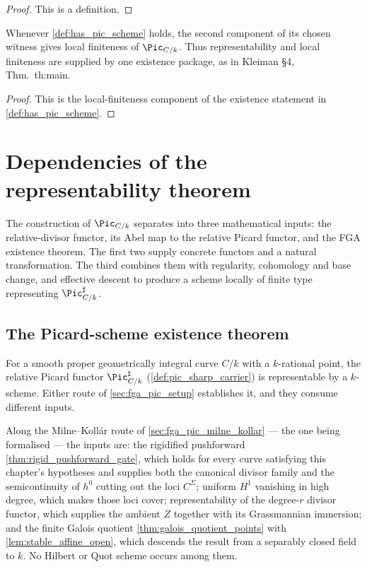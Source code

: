 \begin{proof}\leanok
  This is a definition.
\end{proof}

\begin{definition}\leanok
  \label{def:inst_pic_scheme_lft}
  Whenever \cref{def:has_pic_scheme} holds, the second component of its
  chosen witness gives local finiteness of \(\Pic_{C/k}\). Thus
  representability and local finiteness are supplied by one existence
  package, as in Kleiman \S 4, Thm.~th:main.
\end{definition}

\begin{proof}\leanok
  This is the local-finiteness component of the existence statement in
  \cref{def:has_pic_scheme}.
\end{proof}

\section{Dependencies of the representability theorem}
\label{sec:fga_pic_sorry_closure_order}

The construction of \(\Pic_{C/k}\) separates into three mathematical inputs:
the relative-divisor functor, its Abel map to the relative Picard functor, and
the FGA existence theorem. The first two supply concrete functors and a
natural transformation. The third combines them with regularity, cohomology
and base change, and effective descent to produce a scheme locally of finite
type representing \(\Pic^\sharp_{C/k}\).

\subsection{The Picard-scheme existence theorem}
\label{subsec:sorry_has_pic_scheme}

For a
smooth proper geometrically integral curve \(C/k\) with a \(k\)-rational
point, the relative Picard functor \(\Pic^\sharp_{C/k}\)
(\cref{def:pic_sharp_carrier}) is representable by a \(k\)-scheme. Either route
of \cref{sec:fga_pic_setup} establishes it, and they consume different inputs.

Along the Milne--Koll\'ar route of \cref{sec:fga_pic_milne_kollar} --- the one
being formalised --- the inputs are: the rigidified pushforward
\cref{thm:rigid_pushforward_gate}, which holds for every curve satisfying this
chapter's hypotheses and supplies both the canonical divisor family and the
semicontinuity of \(h^0\) cutting out the loci \(C^\Sigma\); uniform \(H^1\) vanishing in high degree, which makes those loci
cover; representability of the degree-\(r\) divisor functor, which supplies the
ambient \(Z\) together with its Grassmannian immersion; and the finite Galois
quotient \cref{thm:galois_quotient_points} with
\cref{lem:stable_affine_open}, which descends the result from a separably closed
field to \(k\). No Hilbert or Quot scheme occurs among them.

